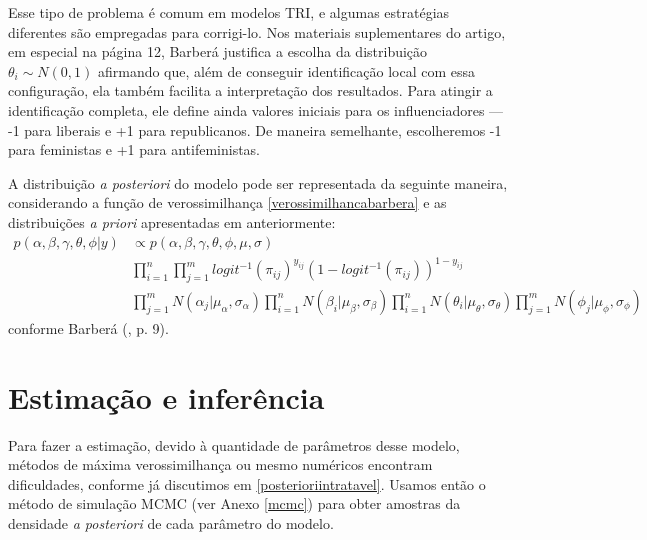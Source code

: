\documentclass[
	12pt,				%
	openright,			%
	twoside,			%
	a4paper,			%
	english,			%
	brazil				%
	]{abntex2}
\begin{document}
 Esse tipo de problema é comum em modelos TRI, e algumas estratégias diferentes são empregadas para corrigi-lo. Nos materiais suplementares do artigo, em especial na página 12, Barberá justifica a escolha da distribuição $\theta_{i} \sim N(0, 1)$ afirmando que, além de conseguir identificação local com essa configuração, ela também facilita a interpretação dos resultados. Para atingir a identificação completa, ele define ainda valores iniciais para os influenciadores --- -1 para liberais e +1 para republicanos. De maneira semelhante, escolheremos -1 para feministas e +1 para antifeministas.

 A distribuição \emph{a posteriori} do modelo pode ser representada da seguinte maneira, considerando a função de verossimilhança \ref{verossimilhancabarbera} e as distribuições \emph{a priori} apresentadas em anteriormente:
 \begin{equation}
    \begin{aligned}
         p(\alpha, \beta, \gamma, \theta, \phi | y) &\propto p(\alpha, \beta, \gamma, \theta, \phi, \mu, \sigma)\\
         &\prod_{i=1}^{n} \prod_{j=1}^{m} logit^{-1}(\pi_{ij})^{y_{ij}} (1 - logit^{-1}(\pi_{ij}))^{1 - y_{ij}}\\
         &\prod_{j=1}^{m} N(\alpha_{j}|\mu_{\alpha}, \sigma_{\alpha}) \prod_{i=1}^{n} N(\beta_{i}|\mu_{\beta}, \sigma_{\beta}) \prod_{i=1}^{n} N(\theta_{i}|\mu_{\theta}, \sigma_{\theta}) \prod_{j=1}^{m} N(\phi_{j}|\mu_{\phi}, \sigma_{\phi})
     \end{aligned}
 \end{equation}
 conforme Barberá (\citeyear{barbera2015}, p. 9).
 
 \section{Estimação e inferência}
  Para fazer a estimação, devido à quantidade de parâmetros desse modelo, métodos de máxima verossimilhança ou mesmo numéricos encontram dificuldades, conforme já discutimos em \ref{posterioriintratavel}. Usamos então o método de simulação MCMC (ver Anexo \ref{mcmc}) para obter amostras da densidade \textit{a posteriori} de cada parâmetro do modelo.
 
\end{document}
